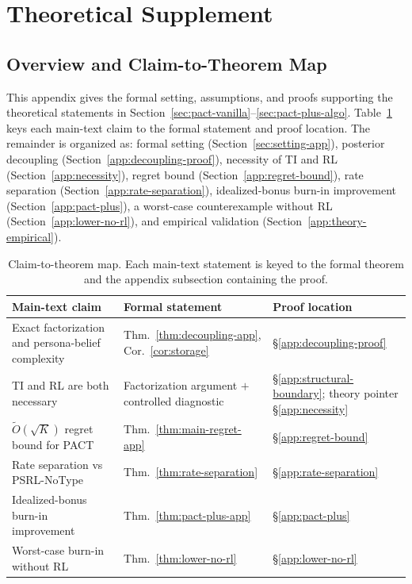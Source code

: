 \section{Theoretical Supplement}
\label{app:theory}

\subsection{Overview and Claim-to-Theorem Map}
\label{app:theory-overview}

This appendix gives the formal setting, assumptions, and proofs supporting the theoretical statements in Section~\ref{sec:pact-vanilla}--\ref{sec:pact-plus-algo}. Table~\ref{tab:theorem-map} keys each main-text claim to the formal statement and proof location. The remainder is organized as: formal setting (Section~\ref{sec:setting-app}), posterior decoupling (Section~\ref{app:decoupling-proof}), necessity of TI and RL (Section~\ref{app:necessity}), regret bound (Section~\ref{app:regret-bound}), rate separation (Section~\ref{app:rate-separation}), idealized-bonus burn-in improvement (Section~\ref{app:pact-plus}), a worst-case counterexample without RL (Section~\ref{app:lower-no-rl}), and empirical validation (Section~\ref{app:theory-empirical}).

\begin{table}[h]
\centering\small
\caption{Claim-to-theorem map. Each main-text statement is keyed to the formal theorem and the appendix subsection containing the proof.}
\label{tab:theorem-map}
\setlength{\tabcolsep}{4pt}
\begin{tabular}{@{}p{}p{}p{}@{}}
\toprule
Main-text claim & Formal statement & Proof location \\
\midrule
Exact factorization and persona-belief complexity & Thm.~\ref{thm:decoupling-app}, Cor.~\ref{cor:storage} & \S\ref{app:decoupling-proof} \\
TI and RL are both necessary & Factorization argument $+$ controlled diagnostic & \S\ref{app:structural-boundary}; theory pointer \S\ref{app:necessity} \\
$\tilde O(\sqrt{K})$ regret bound for PACT & Thm.~\ref{thm:main-regret-app} & \S\ref{app:regret-bound} \\
Rate separation vs PSRL-NoType & Thm.~\ref{thm:rate-separation} & \S\ref{app:rate-separation} \\
Idealized-bonus burn-in improvement & Thm.~\ref{thm:pact-plus-app} & \S\ref{app:pact-plus} \\
Worst-case burn-in without RL & Thm.~\ref{thm:lower-no-rl} & \S\ref{app:lower-no-rl} \\
\bottomrule
\end{tabular}
\end{table}

